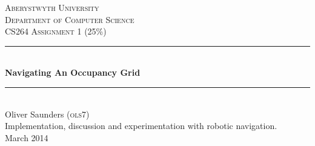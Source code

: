\begin{titlepage}

\newcommand{\HRule}{\rule{\linewidth}{0.5mm}} %

\center %
 

\textsc{\LARGE Aberystwyth University}\\[1.5cm] %
\textsc{\Large Department of Computer Science}\\[0.5cm] %
\textsc{\large CS264 Assignment 1 (25\%)}{}\\[0.5cm] %


\HRule \\[0.4cm]
{ \huge \bfseries Navigating An Occupancy Grid}\\[0.4cm] %
\HRule \\[1.5cm]
 
{\large Oliver Saunders (\textsc{ols7})}\\[1cm] %

Implementation, discussion and experimentation with robotic navigation.\\[1cm]

{\large March 2014}\\[1cm] %

\vfill %

\end{titlepage}


